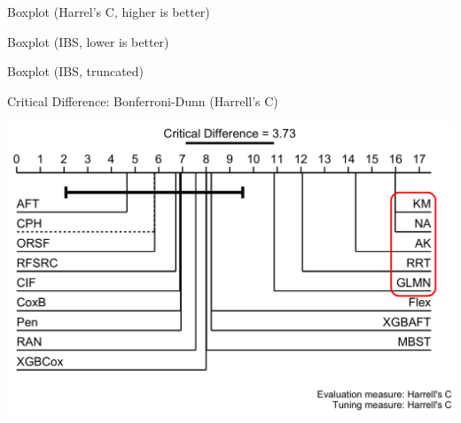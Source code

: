 \documentclass[aspectratio=169,12pt]{beamer}
\begin{document}
\begin{frame}{Boxplot (Harrel's C, higher is better)}
\label{boxplot-harrels-c-higher-is-better}
\begin{center}
\end{center}
\end{frame}

\begin{frame}{Boxplot (IBS, lower is better)}
\label{boxplot-ibs-lower-is-better}
\begin{center}
\end{center}
\end{frame}

\begin{frame}{Boxplot (IBS, truncated)}
\label{boxplot-ibs-truncated}
\begin{center}
\end{center}
\end{frame}

\begin{frame}{Critical Difference: Bonferroni-Dunn (Harrell's C)}
\label{critical-difference-bonferroni-dunn-harrells-c}
\begin{center}
\includegraphics[width=5.69in,height=0.75\textheight]{img/critical-difference-baseline-diff-harrell_c-harrell_c.png}
\end{center}
\end{frame}
\end{document}
